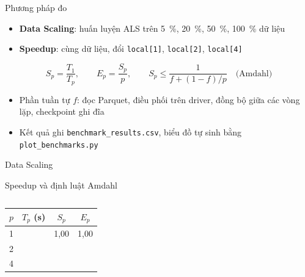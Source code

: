 

\begin{frame}{Phương pháp đo}
  \begin{itemize}
    \item \textbf{Data Scaling}: huấn luyện ALS trên \SI{5}{\percent}, \SI{20}{\percent}, \SI{50}{\percent}, \SI{100}{\percent} dữ liệu
    \item \textbf{Speedup}: cùng dữ liệu, đổi \texttt{local[1]}, \texttt{local[2]}, \texttt{local[4]}
  \end{itemize}
  \[
    S_p = \frac{T_1}{T_p}, \qquad E_p = \frac{S_p}{p}, \qquad
    S_p \le \frac{1}{f + (1-f)/p} \quad \text{(Amdahl)}
  \]
  \begin{itemize}
    \item Phần tuần tự $f$: đọc Parquet, điều phối trên driver, đồng bộ giữa các vòng lặp, checkpoint ghi đĩa
    \item Kết quả ghi \texttt{benchmark\_results.csv}, biểu đồ tự sinh bằng \texttt{plot\_benchmarks.py}
  \end{itemize}
\end{frame}

\begin{frame}{Data Scaling}
  \centering
  \par\smallskip
\end{frame}

\begin{frame}{Speedup và định luật Amdahl}
  \begin{columns}[c]
    \centering
    \centering\small
    \begin{tabular}{c c c c}
      \toprule
      $p$ & $T_p$ (s) & $S_p$ & $E_p$ \\
      \midrule
      1 & \todo{} & 1,00 & 1,00 \\
      2 & \todo{} & \todo{} & \todo{} \\
      4 & \todo{} & \todo{} & \todo{} \\
      \bottomrule
    \end{tabular}
    \par\medskip
  \end{columns}
\end{frame}

